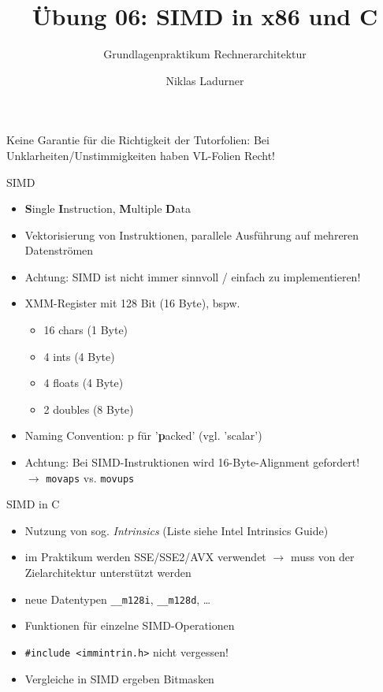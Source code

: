 \documentclass[
  german,            %
  aspectratio=169,    %
]{tumbeamer}
\title{Übung 06: SIMD in x86 und C}
\subtitle{Grundlagenpraktikum Rechnerarchitektur}
\author{Niklas Ladurner}
\institute{\theChairName\\\theDepartmentName\\\theUniversityName}
\date{\DTMdisplaydate{2024}{5}{24}{-1}}
\begin{document}
\maketitle

\begin{frame}[c]{}{}
  \begin{center}
    \LARGE  Keine Garantie für die Richtigkeit der Tutorfolien: Bei Unklarheiten/Unstimmigkeiten
    haben VL-Folien Recht!
  \end{center}
\end{frame}

\begin{frame}[c, fragile]{SIMD}{}
  \begin{itemize}
    \item \textbf{S}ingle \textbf{I}nstruction, \textbf{M}ultiple \textbf{D}ata
    \item Vektorisierung von Instruktionen, parallele Ausführung auf mehreren Datenströmen
    \item Achtung: SIMD ist nicht immer sinnvoll / einfach zu implementieren!
    \item XMM-Register mit 128 Bit (16 Byte), bspw.
    \begin{itemize}
      \item 16 chars (1 Byte)
      \item 4 ints (4 Byte)
      \item 4 floats (4 Byte)
      \item 2 doubles (8 Byte)
    \end{itemize}
    \item Naming Convention: p für '\textbf{p}acked' (vgl. 'scalar')
    \item Achtung: Bei SIMD-Instruktionen wird 16-Byte-Alignment gefordert! \\ $\rightarrow$ \verb|movaps| vs. \verb|movups|
  \end{itemize}
\end{frame}

\begin{frame}[c, fragile]{SIMD in C}{}
  \begin{itemize}
    \item Nutzung von sog. \textit{Intrinsics} (Liste siehe Intel Intrinsics Guide)
    \item im Praktikum werden SSE/SSE2/AVX verwendet $\rightarrow$ muss von der Zielarchitektur unterstützt werden
    \item neue Datentypen \verb|__m128i|, \verb|__m128d|, \ldots
    \item Funktionen für einzelne SIMD-Operationen
    \item \verb|#include <immintrin.h>| nicht vergessen!
    \item Vergleiche in SIMD ergeben Bitmasken
  \end{itemize}
\end{frame}
\end{document}
